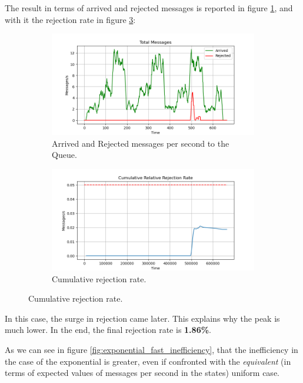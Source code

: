 The result in terms of arrived and rejected messages is reported in figure \ref{fig:exponential_fast_messages}, and with it the rejection rate in figure \ref{fig:exponential_fast_rejection}:

\begin{figure}[H]
    \centering
    \begin{subfigure}{0.85\linewidth}
        \includegraphics[width=\linewidth]{images/Exponential_Fast/messages.png}
        \caption{Arrived and Rejected messages per second to the Queue.}
        \label{fig:exponential_fast_messages}
    \end{subfigure}
    \begin{subfigure}{0.85\linewidth}
        \includegraphics[width=\linewidth]{images/Exponential_Fast/rejectiob_cumulative.png}
        \caption{Cumulative rejection rate.}
        \label{fig:exponential_fast_rejection}
    \end{subfigure}
\end{figure}
In this case, the surge in rejection came later. This explains why the peak is much lower. In the end, the final rejection rate is \textbf{1.86\%}.

As we can see in figure \ref{fig:exponential_fast_inefficiency}, that the inefficiency in the case of the exponential is greater, even if confronted with the \textit{equivalent} (in terms of expected values of messages per second in the states) uniform case. 

